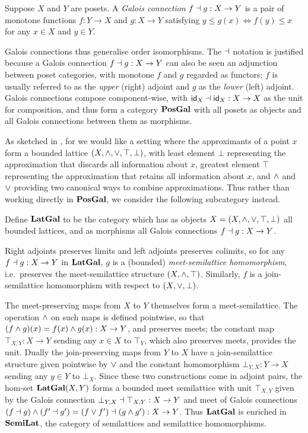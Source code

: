 \begin{definition}
Suppose $X$ and $Y$ are posets. A \emph{Galois connection} $f \dashv g: X \to Y$ is a pair of monotone functions
$f: Y \to X$ and $g: X \to Y$ satisfying $y \leq g(x) \iff f(y) \leq x$ for any $x \in X$ and $y \in Y$.
\end{definition}

\noindent Galois connections thus generalise order isomorphisms. The $\dashv$ notation is justified because a
Galois connection $f \dashv g: X \to Y$ can also be seen an adjunction between poset categories, with monotone
$f$ and $g$ regarded as functors; $f$ is usually referred to as the \emph{upper} (right) adjoint and $g$ as
the \emph{lower} (left) adjoint. Galois connections compose component-wise, with $\mathsf{id}_X \dashv \mathsf{id}_X: X \to X$
as the unit for composition, and thus form a category $\mathbf{PosGal}$ with all posets as objects and all Galois
connections between them as morphisms.

As sketched in , for \GPS we would like a setting where the approximants
of a point $x$ form a bounded lattice $(X, \wedge, \vee, \top, \bot)$, with least element $\bot$ representing
the approximation that discards all information about $x$, greatest element $\top$ representing the
approximation that retains all information about $x$, and $\wedge$ and $\vee$ providing two canonical ways to
combine approximations. Thus rather than working directly in $\mathbf{PosGal}$, we consider the following subcategory
instead.

\begin{definition}
Define $\mathbf{LatGal}$ to be the category which has as objects $X = (X, \wedge, \vee, \top, \bot)$ all bounded
lattices, and as morphisms all Galois connections $f \dashv g: X \to Y$.
\end{definition}

\noindent Right adjoints preserves limits and left adjoints preserves colimits, so for any $f \dashv g: X \to Y$
in $\mathbf{LatGal}$, $g$ is a (bounded) \emph{meet-semilattice homomorphism}, i.e.~preserves the meet-semilattice
structure $(X, \wedge, \top)$. Similarly, $f$ is a join-semilattice homomorphism with respect to $(X, \vee,
\bot)$.

The meet-preserving maps from $X$ to $Y$ themselves form a meet-semilattice. The operation $\wedge$ on such
maps is defined pointwise, so that $(f \wedge g)(x) = f(x) \wedge g(x): X \to Y$, and preserves meets; the
constant map $\top_{X,Y}: X \to Y$ sending any $x \in X$ to $\top_Y$, which also preserves meets, provides the
unit. Dually the join-preserving maps from $Y$ to $X$ have a join-semilattice structure given pointwise by
$\vee$ and the constant homomorphism $\bot_{Y,X}: Y \to X$ sending any $y \in Y$ to $\bot_X$. Since these two
constructions come in adjoint pairs, the hom-set $\mathbf{LatGal}(X,Y)$ forms a bounded meet semilattice with unit
$\top_{X,Y}$ given by the Galois connection $\bot_{Y,X} \dashv \top_{X,Y}: X \to Y$ and meet of Galois
connections $(f \dashv g) \wedge (f' \dashv g') = (f \vee f') \dashv (g \wedge g'): X \to Y$. Thus $\mathbf{LatGal}$ is
enriched in $\mathbf{SemiLat}$, the category of semilattices and semilattice homomorphisms.

